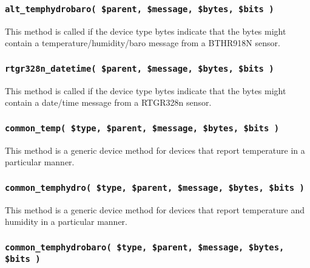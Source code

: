 \documentclass[12pt,a4paper]{article}
\begin{document}
\subsubsection*{\texttt{alt\_temphydrobaro( \$parent, \$message, \$bytes, \$bits )}\label{xPL::RF::Oregon_alt_temphydrobaro_parent_message_bytes_bits_}}


This method is called if the device type bytes indicate that the bytes
might contain a temperature/humidity/baro message from a BTHR918N sensor.

\subsubsection*{\texttt{rtgr328n\_datetime( \$parent, \$message, \$bytes, \$bits )}\label{xPL::RF::Oregon_rtgr328n_datetime_parent_message_bytes_bits_}}


This method is called if the device type bytes indicate that the bytes
might contain a date/time message from a RTGR328n sensor.

\subsubsection*{\texttt{common\_temp( \$type, \$parent, \$message, \$bytes, \$bits )}\label{xPL::RF::Oregon_common_temp_type_parent_message_bytes_bits_}}


This method is a generic device method for devices that report
temperature in a particular manner.

\subsubsection*{\texttt{common\_temphydro( \$type, \$parent, \$message, \$bytes, \$bits )}\label{xPL::RF::Oregon_common_temphydro_type_parent_message_bytes_bits_}}


This method is a generic device method for devices that report
temperature and humidity in a particular manner.

\subsubsection*{\texttt{common\_temphydrobaro( \$type, \$parent, \$message, \$bytes, \$bits )}\label{xPL::RF::Oregon_common_temphydrobaro_type_parent_message_bytes_bits_}}
\end{document}
